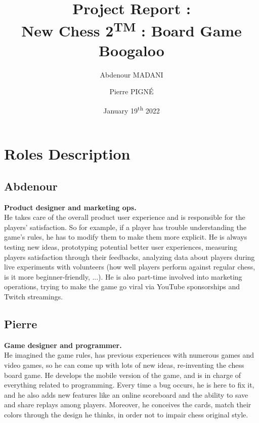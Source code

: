 \documentclass[12pt]{article}
\begin{document}
    
    \title{Project Report :\\\textbf{New Chess 2\textsuperscript{TM} : Board Game Boogaloo}}
    \author{Abdenour MADANI \and Pierre PIGNÉ}
    \date{January 19\textsuperscript{th} 2022}
    \maketitle
    \newpage
    
    \tableofcontents
    \newpage
    
    \section{Roles Description}
        \subsection{Abdenour}
            \textbf{Product designer and marketing ops.}
            \\ He takes care of the overall product user experience and is responsible for the players' satisfaction. So for example, if a player has trouble understanding the game's rules, he has to modify them to make them more explicit. He is always testing new ideas, prototyping potential better user experiences, measuring players satisfaction through their feedbacks, analyzing data about players during live experiments with volunteers (how well players perform against regular chess, is it more beginner-friendly, ...). He is also part-time involved into marketing operations, trying to make the game go viral via YouTube sponsorships and Twitch streamings.
            
        \subsection{Pierre}
            \textbf{Game designer and programmer.}
            \\He imagined the game rules, has previous experiences with numerous games and video games, so he can come up with lots of new ideas, re-inventing the chess board game.
            He develops the mobile version of the game, and is in charge of everything related to programming. Every time a bug occurs, he is here to fix it, and he also adds new features like an online scoreboard and the ability to save and share replays among players. Moreover, he conceives the cards, match their colors through the design he thinks, in order not to impair chess original style.
    
\end{document}
